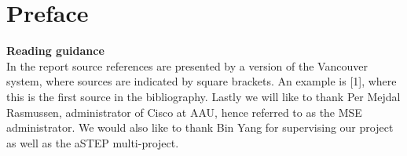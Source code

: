 \chapter*{Preface}

\textbf{Reading guidance}\\


In the report source references are presented by a version of the Vancouver system, where sources are indicated by square brackets. An example is [1], where this is the first source in the bibliography.
Lastly we will like to thank Per Mejdal Rasmussen, administrator of Cisco at AAU, hence referred to as the MSE administrator. We would also like to thank Bin Yang for supervising our project as well as the aSTEP multi-project. 

\begin{multicols}{2}
\signature{Oliver B. Købsted}
\signature{Anders L. Matthiassen}
\signature{Jacob Nielsen}
\signature{Simon A. Pedersen}
\end{multicols}